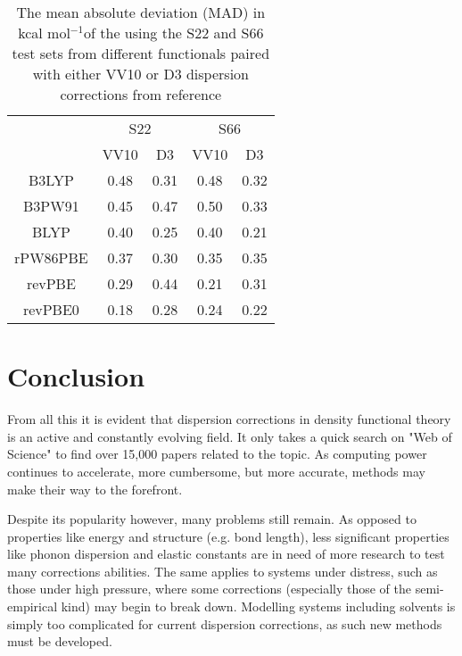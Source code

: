 \documentclass[10pt,a4paper,twocolumn,twoside]{extarticle}
\newcommand{\kcal}{kcal mol\(^{-1}\)}
\begin{document}
	\begin{table}
		\centering
		\begin{tabular}[]{c|c c c c}
					& \multicolumn{2}{c}{S22} & \multicolumn{2}{c}{S66}\\
					& VV10 & D3 & VV10 & D3\\
					\hline
			B3LYP   & 0.48 & 0.31 & 0.48 & 0.32\\
			B3PW91  & 0.45 & 0.47 & 0.50 & 0.33\\
			BLYP    & 0.40 & 0.25 & 0.40 & 0.21\\
			rPW86PBE& 0.37 & 0.30 & 0.35 & 0.35\\
			revPBE  & 0.29 & 0.44 & 0.21 & 0.31\\
			revPBE0 & 0.18 & 0.28 & 0.24 & 0.22\\
		\end{tabular}
		\caption{The mean absolute deviation (MAD) in \kcal of the using the S22 and S66 test sets from different functionals paired with either VV10 or D3 dispersion corrections from reference \cite{Grimme2011-VV10-LDA-GGA-Pairing}}
		\label{tab:VV10D3}
	\end{table}

	\section{Conclusion}
	From all this it is evident that dispersion corrections in density functional theory is an active and constantly evolving field. It only takes a quick search on "Web of Science" to find over 15,000 papers related to the topic. As computing power continues to accelerate, more cumbersome, but more accurate, methods may make their way to the forefront.

	Despite its popularity however, many problems still remain. As opposed to properties like energy and structure (e.g. bond length), less significant properties like phonon dispersion and elastic constants are in need of more research to test many corrections abilities. The same applies to systems under distress, such as those under high pressure, where some corrections (especially those of the semi-empirical kind) may begin to break down. Modelling systems including solvents is simply too complicated for current dispersion corrections, as such new methods must be developed. 
\end{document}
